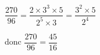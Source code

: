 
    $\dfrac{270}{96} = \dfrac{2\times 3^3\times 5}{2^5\times 3}=\dfrac{3^2\times 5}{2^4}$

    donc $\dfrac{270}{96} = \dfrac{45}{16}$
